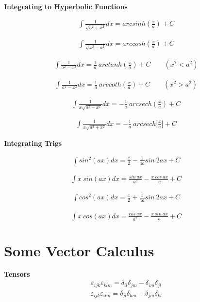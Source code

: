 \documentclass{article}
\begin{document}
\textbf{Integrating to Hyperbolic Functions}

\begin{align*}
    \int \frac{1}{\sqrt{a^2+x^2}} dx = arcsinh(\frac{x}{a}) + C
\end{align*}

\begin{align*}
    \int \frac{1}{\sqrt{x^2-a^2}} dx = arccosh(\frac{x}{a}) + C
\end{align*}

\begin{align*}
    \int \frac{1}{a^2-x^2} dx = \frac{1}{a} \ arctanh(\frac{x}{a}) + C \qquad (x^2<a^2)
\end{align*}

\begin{align*}
    \int \frac{1}{a^2-x^2} dx = \frac{1}{a} \ arccoth(\frac{x}{a}) + C \qquad (x^2>a^2)
\end{align*}

\begin{align*}
    \int \frac{1}{x\sqrt{a^2-x^2}} dx = -\frac{1}{a} \ arcsech(\frac{x}{a}) + C
\end{align*}

\begin{align*}
    \int \frac{1}{x\sqrt{a^2+x^2}} dx = -\frac{1}{a} \ arcsech|\frac{x}{a}| + C
\end{align*}
\newline

\textbf{Integrating Trigs}

\begin{align*}
    \int sin^2(ax) dx = \frac{x}{2} - \frac{1}{4a} sin \ 2ax + C
\end{align*}

\begin{align*}
    \int x \ sin(ax) dx = \frac{sin \ ax}{a^2} - \frac{x \ cos \ ax}{a}+ C
\end{align*}

\begin{align*}
    \int cos^2(ax) dx = \frac{x}{2} + \frac{1}{4a} sin \ 2ax + C
\end{align*}

\begin{align*}
    \int x \ cos(ax) dx = \frac{cos \ ax}{a^2} - \frac{x \ sin \ ax}{a}+ C
\end{align*}

\newpage


\section{Some Vector Calculus}
\Large \textbf{Tensors}
\begin{align*}
    \varepsilon_{ijk} \varepsilon_{klm} = \delta_{il} \delta_{jm} - \delta_{im} \delta_{jl}
\end{align*}
\begin{align*}
    \varepsilon_{ijk} \varepsilon_{ilm} = \delta_{jl} \delta_{km} - \delta_{jm} \delta_{kl}
\end{align*}
\newline
\end{document}
